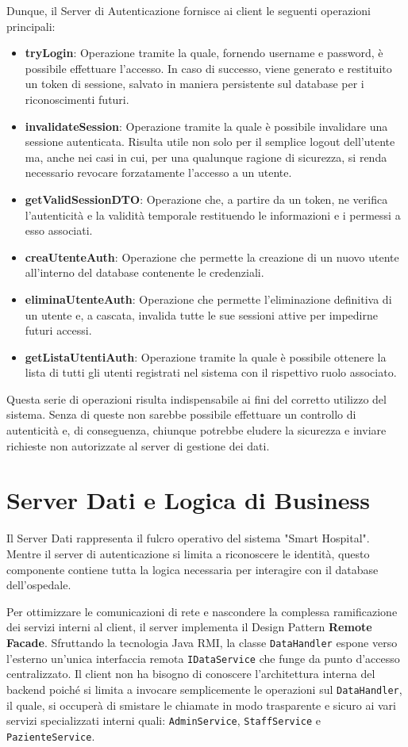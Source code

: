 Dunque, il Server di Autenticazione fornisce ai client le seguenti operazioni principali: 
\begin{itemize}
    \item \textbf{tryLogin}: Operazione tramite la quale, fornendo username e password, è possibile effettuare l'accesso. In caso di successo, viene generato e restituito un token di sessione, salvato in maniera persistente sul database per i riconoscimenti futuri. 
    \item \textbf{invalidateSession}: Operazione tramite la quale è possibile invalidare una sessione autenticata. Risulta utile non solo per il semplice logout dell'utente ma, anche nei casi in cui, per una qualunque ragione di sicurezza, si renda necessario revocare forzatamente l'accesso a un utente. 
    \item \textbf{getValidSessionDTO}: Operazione che, a partire da un token, ne verifica l'autenticità e la validità temporale restituendo le informazioni e i permessi a esso associati. 
    \item \textbf{creaUtenteAuth}: Operazione che permette la creazione di un nuovo utente all'interno del database contenente le credenziali.
    \item \textbf{eliminaUtenteAuth}: Operazione che permette l'eliminazione definitiva di un utente e, a cascata, invalida tutte le sue sessioni attive per impedirne futuri accessi. 
    \item \textbf{getListaUtentiAuth}: Operazione tramite la quale è possibile ottenere la lista di tutti gli utenti registrati nel sistema con il rispettivo ruolo associato.
\end{itemize}

Questa serie di operazioni risulta indispensabile ai fini del corretto utilizzo del sistema. Senza di queste non sarebbe possibile effettuare un controllo di autenticità e, di conseguenza, chiunque potrebbe eludere la sicurezza e inviare richieste non autorizzate al server di gestione dei dati.

\section{Server Dati e Logica di Business}
Il Server Dati rappresenta il fulcro operativo del sistema "Smart Hospital". Mentre il server di autenticazione si limita a riconoscere le identità, questo componente contiene tutta la logica necessaria per interagire con il database dell'ospedale. 

Per ottimizzare le comunicazioni di rete e nascondere la complessa ramificazione dei servizi interni al client, il server implementa il Design Pattern \textbf{Remote Facade}. Sfruttando la tecnologia Java RMI, la classe \texttt{DataHandler} espone verso l'esterno un'unica interfaccia remota \texttt{IDataService} che funge da punto d'accesso centralizzato. Il client non ha bisogno di conoscere l'architettura interna del backend poiché si limita a invocare semplicemente le operazioni sul \texttt{DataHandler}, il quale, si occuperà di smistare le chiamate in modo trasparente e sicuro ai vari servizi specializzati interni quali: \texttt{AdminService}, \texttt{StaffService} e \texttt{PazienteService}.

